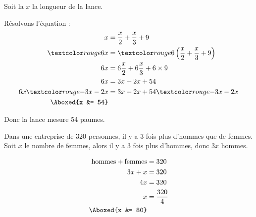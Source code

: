 \documentclass["../Cours.tex"]{subfiles}
\begin{document}
\begin{questions}
    \clearpage
    \exercice 
    \begin{minipage}{0.45\linewidth}
    Soit la $x$ la longueur de la lance.
        \begin{center}
        \end{center}
    \end{minipage}
    \begin{minipage}{0.45\linewidth}
    Résolvons l'équation : 
        \begin{align*}
            x &= \frac{x}{2} + \frac{x}{3} + 9 \\
            \red{6}x &= \red{6} \left( \frac{x}{2} + \frac{x}{3} + 9 \right) \\
            6x &= 6\frac{x}{2} + 6\frac{x}{3} + 6 \times 9 \\
            6x &= 3x + 2x + 54 \\
            6x \red{-3x-2x} &= 3x + 2x + 54 \red{-3x-2x} \\ 
            \Aboxed{x &= 54}
        \end{align*}

    Donc la lance mesure 54 paumes.
    \end{minipage}
    
    \exercice Dans une entreprise de 320 personnes, il y a 3 fois plus d'hommes que de femmes. Soit $x$ le nombre de femmes, alors il y a 3 fois plus d'hommes, donc $3x$ hommes.

    \begin{align*}
        \mbox{hommes} + \mbox{femmes} &= 320 \\
        3x + x &= 320 \\
        4x &= 320 \\ 
        x &= \frac{320}{4} \\
        \Aboxed{x &= 80}
    \end{align*}


\end{questions}
\end{document}
